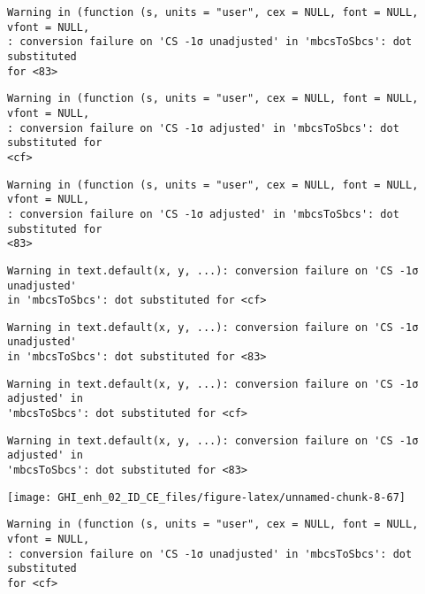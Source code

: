 \documentclass[
  10pt,
  a4paper,oneside]{article}
\begin{document}
\begin{verbatim}
Warning in (function (s, units = "user", cex = NULL, font = NULL, vfont = NULL,
: conversion failure on 'CS -1σ unadjusted' in 'mbcsToSbcs': dot substituted
for <83>
\end{verbatim}

\begin{verbatim}
Warning in (function (s, units = "user", cex = NULL, font = NULL, vfont = NULL,
: conversion failure on 'CS -1σ adjusted' in 'mbcsToSbcs': dot substituted for
<cf>
\end{verbatim}

\begin{verbatim}
Warning in (function (s, units = "user", cex = NULL, font = NULL, vfont = NULL,
: conversion failure on 'CS -1σ adjusted' in 'mbcsToSbcs': dot substituted for
<83>
\end{verbatim}

\begin{verbatim}
Warning in text.default(x, y, ...): conversion failure on 'CS -1σ unadjusted'
in 'mbcsToSbcs': dot substituted for <cf>
\end{verbatim}

\begin{verbatim}
Warning in text.default(x, y, ...): conversion failure on 'CS -1σ unadjusted'
in 'mbcsToSbcs': dot substituted for <83>
\end{verbatim}

\begin{verbatim}
Warning in text.default(x, y, ...): conversion failure on 'CS -1σ adjusted' in
'mbcsToSbcs': dot substituted for <cf>
\end{verbatim}

\begin{verbatim}
Warning in text.default(x, y, ...): conversion failure on 'CS -1σ adjusted' in
'mbcsToSbcs': dot substituted for <83>
\end{verbatim}

\begin{center}\texttt{[image: GHI\_enh\_02\_ID\_CE\_files/figure-latex/unnamed-chunk-8-67]} \end{center}

\begin{verbatim}
Warning in (function (s, units = "user", cex = NULL, font = NULL, vfont = NULL,
: conversion failure on 'CS -1σ unadjusted' in 'mbcsToSbcs': dot substituted
for <cf>
\end{verbatim}
\end{document}
